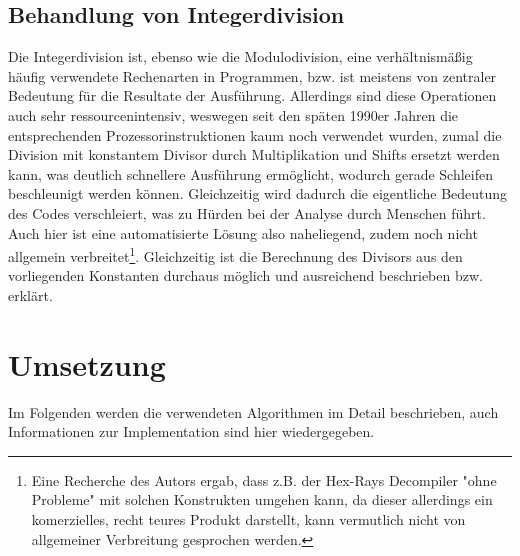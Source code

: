 \documentclass[11pt]{article}
\begin{document}
\subsection{Behandlung von Integerdivision} Die Integerdivision ist, ebenso wie die Modulodivision,
eine verhältnismäßig häufig verwendete Rechenarten in Programmen, bzw. ist meistens von zentraler
Bedeutung für die Resultate der Ausführung. Allerdings sind diese Operationen auch sehr
ressourcenintensiv, weswegen seit den späten 1990er Jahren die entsprechenden Prozessorinstruktionen
kaum noch verwendet wurden, zumal die Division mit konstantem Divisor durch  Multiplikation und Shifts
ersetzt werden kann, was deutlich schnellere Ausführung ermöglicht\cite{division:2}, wodurch
gerade Schleifen beschleunigt werden können. Gleichzeitig wird dadurch die eigentliche
Bedeutung des Codes verschleiert, was zu Hürden bei der Analyse durch Menschen führt. Auch hier ist
eine automatisierte Lösung also naheliegend, zudem noch nicht allgemein verbreitet\footnote{Eine
Recherche des Autors ergab, dass z.B. der Hex-Rays Decompiler "ohne Probleme" mit solchen
Konstrukten umgehen kann, da dieser allerdings ein komerzielles, recht teures Produkt
darstellt, kann vermutlich nicht von allgemeiner Verbreitung gesprochen werden.}. Gleichzeitig ist
die Berechnung des Divisors aus den vorliegenden Konstanten durchaus möglich und ausreichend
beschrieben bzw. erklärt\cite{stackexchange:4}.

\section{Umsetzung} Im Folgenden werden die verwendeten Algorithmen im Detail beschrieben,
auch Informationen zur Implementation sind hier wiedergegeben.
\end{document}
